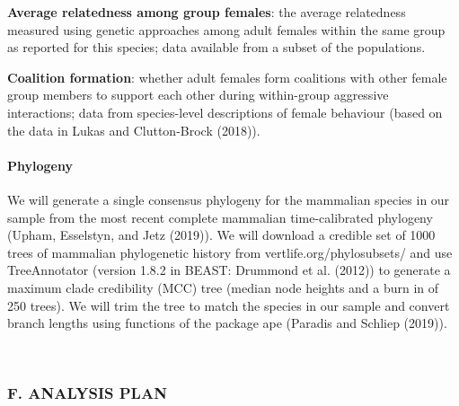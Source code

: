 \documentclass[]{article}
\let\oldparagraph\paragraph
\renewcommand{\paragraph}[1]{\oldparagraph{#1}\mbox{}}
\begin{document}
\textbf{Average relatedness among group females}: the average
relatedness measured using genetic approaches among adult females within
the same group as reported for this species; data available from a
subset of the populations.

\textbf{Coalition formation}: whether adult females form coalitions with
other female group members to support each other during within-group
aggressive interactions; data from species-level descriptions of female
behaviour (based on the data in Lukas and Clutton-Brock (2018)).

\hypertarget{phylogeny}{%
\paragraph{\texorpdfstring{\textbf{Phylogeny}}{Phylogeny}}\label{phylogeny}}

We will generate a single consensus phylogeny for the mammalian species
in our sample from the most recent complete mammalian time-calibrated
phylogeny (Upham, Esselstyn, and Jetz (2019)). We will download a
credible set of 1000 trees of mammalian phylogenetic history from
vertlife.org/phylosubsets/ and use TreeAnnotator (version 1.8.2 in
BEAST: Drummond et al. (2012)) to generate a maximum clade credibility
(MCC) tree (median node heights and a burn in of 250 trees). We will
trim the tree to match the species in our sample and convert branch
lengths using functions of the package ape (Paradis and Schliep (2019)).

~

\hypertarget{f.-analysis-plan}{%
\subsubsection{F. ANALYSIS PLAN}\label{f.-analysis-plan}}
\end{document}
